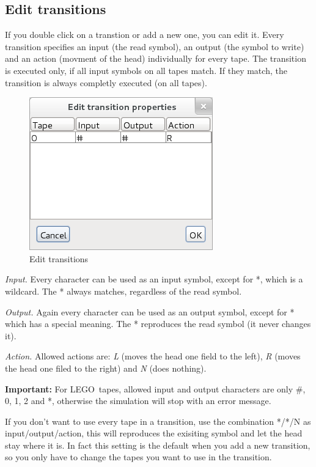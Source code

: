 \documentclass[%
  a4paper,%
  11pt,%
  blue,%
  hyperref	%
  ]{tubsartcl}
\begin{document}
\subsection{Edit transitions}
\label{sec:edit-transitions}
If you double click on a transtion or add a new one, you can edit it. Every transition specifies an input (the read symbol), an output (the symbol to write) and an action (movment of the head) individually for every tape. The transition is executed only, if all input symbols on all tapes match. If they match, the transition is always completly executed (on all tapes).

\begin{figure}[!htb]
\begin{center}
\includegraphics[scale=0.5]{graphics_gui/edit_transitions.png}
\end{center}
\caption{Edit transitions}
\label{pic:edit_transitions}
\end{figure}

\bigskip

\emph{Input.} Every character can be used as an input symbol, except for *, which is a wildcard. The * always matches, regardless of the read symbol.

\emph{Output.} Again every character can be used as an output symbol, except for * which has a special meaning. The * reproduces the read symbol (it never changes it).

\emph{Action.} Allowed actions are: \emph{L} (moves the head one field to the left), \emph{R} (moves the head one filed to the right) and \emph{N} (does nothing).
\bigskip

\textbf{Important:}  For LEGO\textregistered\, tapes, allowed input and output characters are only \#, 0, 1, 2 and *, otherwise the simulation will stop with an error message.

If you don't want to use every tape in a transition, use the combination */*/N as input/output/action, this will reproduces the exisiting symbol and let the head stay where it is. In fact this setting is the default when you add a new transition, so you only have to change the tapes you want to use in the transition.
\end{document}
